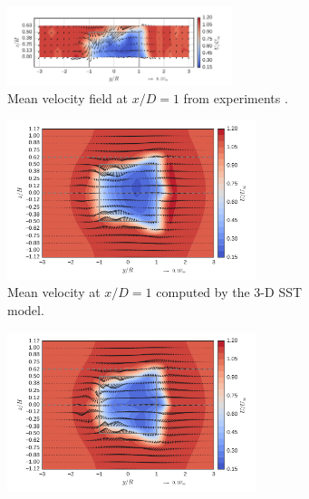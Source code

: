 \documentclass[aip,graphicx]{revtex4-1}
\begin{document}
\begin{figure}
    \centering
    \begin{subfigure}[b]{\textwidth}
        \centering

        \includegraphics[clip, trim=0 0.1in 0.3in 0.2in,
        width=0.72\textwidth]{meancontquiv_exp}

        \caption{Mean velocity field at $x/D=1$ from experiments
            \cite{Bachant2016-RVAT-Re-dep}.}

        \label{fig:br-cfd-meancontquiv-exp}
    \end{subfigure}

    \begin{subfigure}[b]{\textwidth}
        \centering

        \includegraphics[clip, trim=0 0.2in 0 0.15in,
        width=0.8\textwidth]{meancontquiv_kOmegaSST}

        \caption{Mean velocity at $x/D=1$ computed by the 3-D SST model.}

        \label{fig:meancontquiv-SST}
    \end{subfigure}

    \begin{subfigure}[b]{\textwidth}
        \centering

        \includegraphics[clip, trim=0 0.2in 0 0.15in,
        width=0.8\textwidth]{meancontquiv_SpalartAllmaras}


\end{subfigure}
\end{figure}
\end{document}
